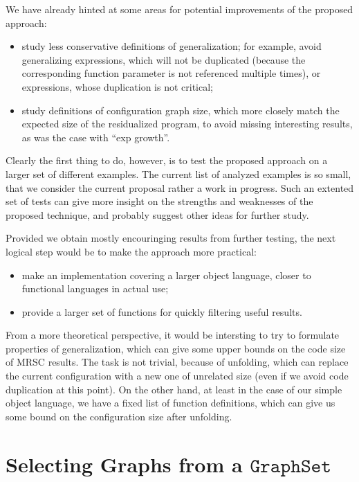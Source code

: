 \documentclass[submission,copyright,creativecommons]{eptcs}
\begin{document}
We have already hinted at some areas for potential improvements of the proposed approach:
\begin{itemize}
  \item study less conservative definitions of generalization; for example, avoid generalizing
    expressions, which will not be duplicated (because the corresponding function parameter is
    not referenced multiple times), or expressions, whose duplication is not critical;
  \item study definitions of configuration graph size, which more closely match the expected
    size of the residualized program, to avoid missing interesting results, as was the case
    with ``exp growth''.
\end{itemize}
Clearly the first thing to do, however, is to test the proposed approach on a larger set of
different examples.
The current list of analyzed examples is so small, that we consider the current proposal
rather a work in progress.
Such an extented set of tests can give more insight on the strengths and weaknesses of the
proposed technique, and probably suggest other ideas for further study.

Provided we obtain mostly encouringing results from further testing, the next logical 
step would be to make the approach more practical:
\begin{itemize}
  \item make an implementation covering a larger object language, closer to functional languages
    in actual use;
  \item provide a larger set of functions for quickly filtering useful results.
\end{itemize}

From a more theoretical perspective, it would be intersting to try to formulate properties
of generalization, which can give some upper bounds on the code size of MRSC results.
The task is not trivial, because of unfolding, which can replace the current configuration
with a new one of unrelated size (even if we avoid code duplication at this point).
On the other hand, at least in the case of our simple object language, we have a fixed
list of function definitions, which can give us some bound on the configuration size
after unfolding.




\appendix

\clearpage
\section{Selecting Graphs from a $\mathtt{GraphSet}$}\label{app:FilterGraphSet}
\end{document}
